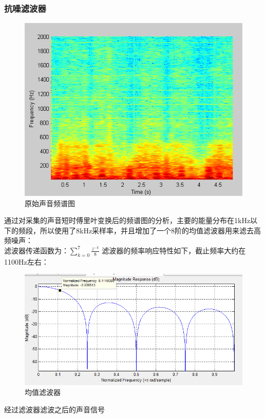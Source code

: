 \documentclass[16pt,a4paper]{article}
\begin{document}
\subsubsection{抗噪滤波器}
\begin{figure}[H]
\centering
\includegraphics[scale = 1]{spectrogram_raw.png}
\caption{原始声音频谱图} 
\end{figure}
通过对采集的声音短时傅里叶变换后的频谱图的分析，主要的能量分布在1kHz以下的频段，所以使用了8kHz采样率，并且增加了一个8阶的均值滤波器用来滤去高频噪声：
\\
滤波器传递函数为：$\sum\limits_{k=0}^{7}\frac{z^{-k}}{8}$
滤波器的频率响应特性如下，截止频率大约在1100Hz左右：
\begin{figure}[H]
\centering
\includegraphics[scale = 0.7]{avg_filter.png}
\caption{均值滤波器} 
\end{figure}
经过滤波器滤波之后的声音信号
\end{document}

